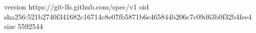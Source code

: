 version https://git-lfs.github.com/spec/v1
oid sha256:521b2740f341682c16714c8e07fb5871b6e465844b206c7c09d63b0f32b4fee4
size 5592544
